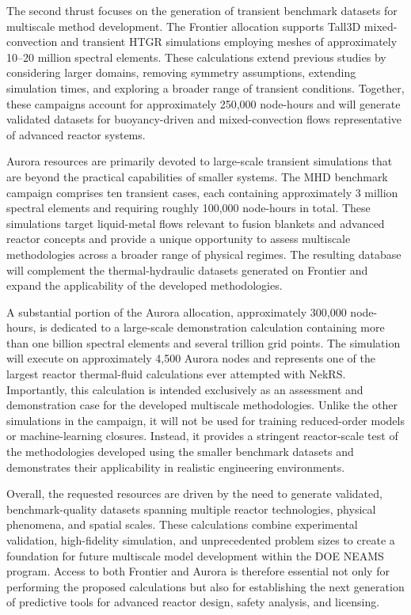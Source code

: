 The second thrust focuses on the generation of transient benchmark datasets for multiscale method development. The Frontier allocation supports Tall3D mixed-convection and transient HTGR simulations employing meshes of approximately 10--20 million spectral elements. These calculations extend previous studies by considering larger domains, removing symmetry assumptions, extending simulation times, and exploring a broader range of transient conditions. Together, these campaigns account for approximately 250,000 node-hours and will generate validated datasets for buoyancy-driven and mixed-convection flows representative of advanced reactor systems.

Aurora resources are primarily devoted to large-scale transient simulations that are beyond the practical capabilities of smaller systems. The MHD benchmark campaign comprises ten transient cases, each containing approximately 3 million spectral elements and requiring roughly 100,000 node-hours in total. These simulations target liquid-metal flows relevant to fusion blankets and advanced reactor concepts and provide a unique opportunity to assess multiscale methodologies across a broader range of physical regimes. The resulting database will complement the thermal-hydraulic datasets generated on Frontier and expand the applicability of the developed methodologies.

A substantial portion of the Aurora allocation, approximately 300,000 node-hours, is dedicated to a large-scale demonstration calculation containing more than one billion spectral elements and several trillion grid points. The simulation will execute on approximately 4,500 Aurora nodes and represents one of the largest reactor thermal-fluid calculations ever attempted with NekRS. Importantly, this calculation is intended exclusively as an assessment and demonstration case for the developed multiscale methodologies. Unlike the other simulations in the campaign, it will not be used for training reduced-order models or machine-learning closures. Instead, it provides a stringent reactor-scale test of the methodologies developed using the smaller benchmark datasets and demonstrates their applicability in realistic engineering environments.

Overall, the requested resources are driven by the need to generate validated, benchmark-quality datasets spanning multiple reactor technologies, physical phenomena, and spatial scales. These calculations combine experimental validation, high-fidelity simulation, and unprecedented problem sizes to create a foundation for future multiscale model development within the DOE NEAMS program. Access to both Frontier and Aurora is therefore essential not only for performing the proposed calculations but also for establishing the next generation of predictive tools for advanced reactor design, safety analysis, and licensing.




